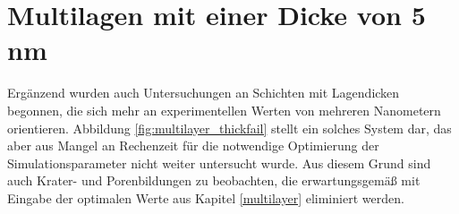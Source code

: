 \section{Multilagen mit einer Dicke von 5 nm}

Ergänzend wurden auch Untersuchungen an Schichten mit Lagendicken begonnen, die sich mehr an experimentellen Werten von mehreren Nanometern orientieren.
Abbildung \ref{fig:multilayer_thickfail} stellt ein solches System dar, das aber aus Mangel an Rechenzeit für die notwendige Optimierung der Simulationsparameter nicht weiter untersucht wurde.
Aus diesem Grund sind auch Krater- und Porenbildungen zu beobachten, die erwartungsgemäß mit Eingabe der optimalen Werte aus Kapitel \ref{multilayer} eliminiert werden.
